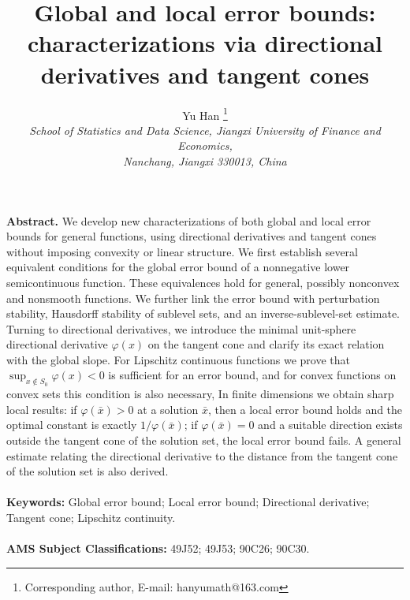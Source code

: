 \documentclass[11pt]{article}
\begin{document}
\title{{Global and local error bounds: characterizations via directional derivatives and tangent cones}}
\author{{Yu Han \footnote{Corresponding author,  E-mail: hanyumath@163.com} }\\
{\small\it School of Statistics and Data Science, Jiangxi University of Finance and Economics, }\\
{\small\it  Nanchang, Jiangxi 330013,  China} }
\date{}
\maketitle
\vspace*{-9mm}
\begin{center}
\begin{minipage}{6.2in}
{\bf Abstract.} We develop new characterizations of both global and local error bounds for general functions, using directional derivatives and tangent cones without imposing convexity or linear structure.  We first establish several equivalent conditions for the global error bound of a nonnegative lower semicontinuous function.   These equivalences hold for general, possibly nonconvex and nonsmooth functions.  We further link the error bound with perturbation stability, Hausdorff stability of sublevel sets, and an inverse-sublevel-set estimate.  Turning to directional derivatives, we introduce the minimal unit-sphere directional derivative \(\varphi(x)\) on the tangent cone and clarify its exact relation with the global slope.  For Lipschitz continuous functions we prove that \(\sup_{x\notin S_0} \varphi(x) < 0\) is sufficient for an error bound, and for convex functions on convex sets this condition is also necessary,    In finite dimensions we obtain sharp local results: if \(\varphi(\bar{x}) > 0\) at a solution \(\bar{x}\), then a local error bound holds and the optimal constant is exactly \(1/\varphi(\bar{x})\); if \(\varphi(\bar{x}) = 0\) and a suitable direction exists outside the tangent cone of the solution set, the local error bound fails.   A general estimate relating the directional derivative to the distance from the tangent cone of the solution set is also derived.
  \\ \ \\
{\bf Keywords:}  Global   error bound;  Local error bound;   Directional derivative;  Tangent cone;   Lipschitz continuity.
\\ \ \\
{\bf AMS Subject Classifications:}  49J52; 49J53; 90C26; 90C30. 

\end{minipage}
\end{center}
\end{document}
